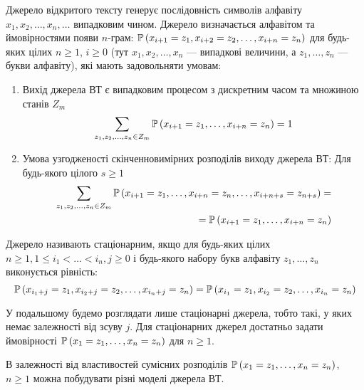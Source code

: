 \begin{definition}
    Джерело відкритого тексту генерує послідовність символів алфавіту 
    $x_1, x_2, \dots, x_n, \dots$ випадковим чином.
    Джерело визначається алфавітом та ймовірностями появи $n$-грам: 
    $\mathbb{P}\left( x_{i+1}=z_1, x_{i+2}=z_2, \dots, x_{i+n}=z_n \right)$
    для будь-яких цілих  $n \ge 1$, $i \geq 0$
    (тут $x_1, x_2, \dots, x_n$ --- випадкові величини,
    а $z_1, \dots, z_n$ --- букви алфавіту), які мають задовольняти умовам: 

    \begin{enumerate}
        \item Вихід джерела ВТ є випадковим процесом
            з дискретним часом та множиною станів  $Z_m$
        $$\sum_{z_1, z_2, \dots, z_n \in Z_m}
            \mathbb{P}\left( x_{i+1}=z_1, \dots, x_{i+n}=z_n \right)=1$$
        \item Умова узгодженості
            скінченновимірних розподілів виходу джерела ВТ:
            Для будь-якого цілого  ${s\ge 1}$
        \begin{align*}
            \sum_{z_1, z_2, \dots, z_n \in Z_m}
                \mathbb{P}\left( x_{i+1}=z_1, \dots, x_{i+n}=z_n, \dots, x_{i+n+s}
                    =z_{n+s} \right) = \\
                = \mathbb{P}\left( x_{i+1}=z_1, \dots, x_{i+n}=z_n \right)
        \end{align*}
    \end{enumerate}
\end{definition}

\begin{definition}
    Джерело називають стаціонарним, якщо для будь-яких цілих  $n\ge 1,
    1\le i_1<\dots<i_n,j\ge 0$
    і будь-якого набору букв алфавіту  $z_1, \dots,z_n$ виконується  рівність:
    $$\mathbb{P}\left( x_{i_1+j}=z_1, x_{i_2+j}=z_2, \dots, x_{i_n+j}=z_n \right)
        = \mathbb{P}\left( x_{i_1}=z_1, x_{i_2}=z_2, \dots, x_{i_n}=z_n \right)$$
\end{definition}

У подальшому будемо розглядати лише стаціонарні джерела, тобто такі, у яких
немає залежності від зсуву $j$.
Для стаціонарних джерел достатньо задати ймовірності
$\mathbb{P}\left( x_1=z_1,\dots,x_n=z_n \right)$ для ${n\ge 1}$.

В залежності від властивостей сумісних розподілів 
$\mathbb{P}\left( x_1=z_1, \dots, x_n=z_n \right)$, $n\ge 1$
можна побудувати різні моделі джерела ВТ.

